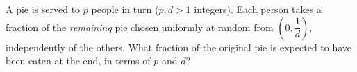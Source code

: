 A pie is served to $p$ people in turn ($p,d>1$ integers). Each person takes a fraction of the \emph{remaining} pie chosen uniformly at random from $\left(0,\dfrac1d\right)$, independently of the others. What fraction of the original pie is expected to have been eaten at the end, in terms of $p$ and $d$?
